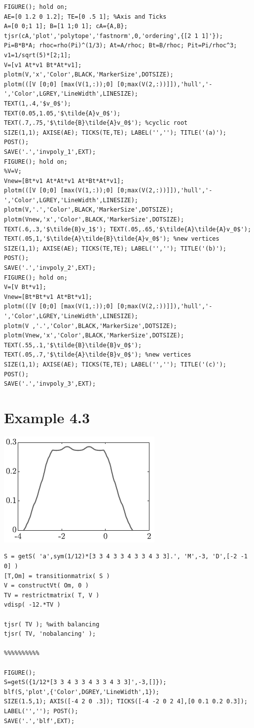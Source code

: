 {\small%
\begin{lstlisting}
FIGURE(); hold on;
AE=[0 1.2 0 1.2]; TE=[0 .5 1]; %Axis and Ticks
A=[0 0;1 1]; B=[1 1;0 1]; cA={A,B}; 
tjsr(cA,'plot','polytope','fastnorm',0,'ordering',{[2 1 1]'});
Pi=B*B*A; rhoc=rho(Pi)^(1/3); At=A/rhoc; Bt=B/rhoc; Pit=Pi/rhoc^3; v1=1/sqrt(5)*[2;1];
V=[v1 At*v1 Bt*At*v1];
plotm(V,'x','Color',BLACK,'MarkerSize',DOTSIZE);
plotm(([V [0;0] [max(V(1,:));0] [0;max(V(2,:))]]),'hull','-','Color',LGREY,'LineWidth',LINESIZE);
TEXT(1,.4,'$v_0$');
TEXT(0.05,1.05,'$\tilde{A}v_0$'); 
TEXT(.7,.75,'$\tilde{B}\tilde{A}v_0$'); %cyclic root
SIZE(1,1); AXISE(AE); TICKS(TE,TE); LABEL('',''); TITLE('(a)'); POST();
SAVE('.','invpoly_1',EXT);
FIGURE(); hold on;
%V=V;
Vnew=[Bt*v1 At*At*v1 At*Bt*At*v1];
plotm(([V [0;0] [max(V(1,:));0] [0;max(V(2,:))]]),'hull','-','Color',LGREY,'LineWidth',LINESIZE);
plotm(V,'.','Color',BLACK,'MarkerSize',DOTSIZE);
plotm(Vnew,'x','Color',BLACK,'MarkerSize',DOTSIZE);
TEXT(.6,.3,'$\tilde{B}v_1$'); TEXT(.05,.65,'$\tilde{A}\tilde{A}v_0$'); TEXT(.05,1,'$\tilde{A}\tilde{B}\tilde{A}v_0$'); %new vertices
SIZE(1,1); AXISE(AE); TICKS(TE,TE); LABEL('',''); TITLE('(b)'); POST();
SAVE('.','invpoly_2',EXT);
FIGURE(); hold on;
V=[V Bt*v1]; 
Vnew=[Bt*Bt*v1 At*Bt*v1];
plotm(([V [0;0] [max(V(1,:));0] [0;max(V(2,:))]]),'hull','-','Color',LGREY,'LineWidth',LINESIZE);
plotm(V ,'.','Color',BLACK,'MarkerSize',DOTSIZE);
plotm(Vnew,'x','Color',BLACK,'MarkerSize',DOTSIZE);
TEXT(.55,.1,'$\tilde{B}\tilde{B}v_0$'); TEXT(.05,.7,'$\tilde{A}\tilde{B}v_0$'); %new vertices
SIZE(1,1); AXISE(AE); TICKS(TE,TE); LABEL('',''); TITLE('(c)'); POST();
SAVE('.','invpoly_3',EXT);
\end{lstlisting}%
}

\newpage
\section{Example 4.3}
\begin{center}
\includegraphics{./graphics/blf}	
\end{center}
\begin{lstlisting}
S = getS( 'a',sym(1/12)*[3 3 4 3 3 4 3 3 4 3 3].', 'M',-3, 'D',[-2 -1 0] )
[T,Om] = transitionmatrix( S )
V = constructVt( Om, 0 )
TV = restrictmatrix( T, V )
vdisp( -12.*TV )

tjsr( TV ); %with balancing
tjsr( TV, 'nobalancing' );

%%%%%%%%%%

FIGURE();
S=getS({1/12*[3 3 4 3 3 4 3 3 4 3 3]',-3,[]});
blf(S,'plot',{'Color',DGREY,'LineWidth',1}); 
SIZE(1.5,1); AXIS([-4 2 0 .3]); TICKS([-4 -2 0 2 4],[0 0.1 0.2 0.3]); LABEL('',''); POST();
SAVE('.','blf',EXT);
\end{lstlisting}



